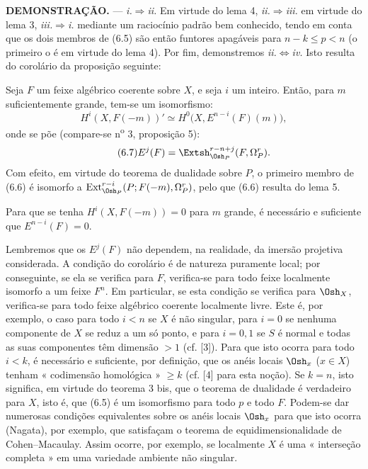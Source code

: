 \noindent\textbf{DEMONSTRAÇÃO.} --- \textit{i.}$\Rightarrow$\textit{ii.} Em
virtude do lema 4, \textit{ii.}$\Rightarrow$\textit{iii.} em virtude do lema 3,
\textit{iii.}$\Rightarrow$\textit{i.} mediante um raciocínio padrão bem conhecido,
tendo em conta que os dois membros de (6.5) são então funtores apagáveis
para $n-k\leq p<n$ (o primeiro o é em virtude do lema 4). Por fim, demonstremos
\textit{ii.}$\Leftrightarrow$\textit{iv.} Isto resulta do corolário da
proposição seguinte:

 Seja $F$ um feixe algébrico coerente sobre $X$, e
seja $i$ um inteiro. Então, para $m$ suficientemente grande, tem-se um isomorfismo:
\begin{equation}\tag{6.6}
  H^{i}(X,F(-m))'
  \simeq H^{0}\bigl(X,E^{n-i}(F)(m)\bigr),
\end{equation}
onde se põe (compare-se n\textsuperscript{o} 3, proposição 5):
\begin{equation}\tag{6.7}
  E^{j}(F)=\Extsh_{\Osh_P}^{r-n+j}(F,\Omega_P^{r}).
\end{equation}
Com efeito, em virtude do teorema de dualidade sobre $P$, o primeiro membro de (6.6)
é isomorfo a
$\operatorname{Ext}_{\Osh_P}^{r-i}(P;F(-m),\Omega_P^{r})$, pelo que (6.6) resulta
do lema 5.

 Para que se tenha $H^{i}(X,F(-m))=0$ para $m$ grande, é
necessário e suficiente que $E^{n-i}(F)=0$.

Lembremos que os $E^{j}(F)$ não dependem, na realidade, da imersão projetiva
considerada. A condição do corolário é de natureza puramente local; por conseguinte,
se ela se verifica para $F$, verifica-se para todo feixe localmente
isomorfo a um feixe $F^{n}$. Em particular, se esta condição se verifica
para $\Osh_X$, verifica-se para todo feixe algébrico coerente localmente
livre. Este é, por exemplo, o caso para todo $i<n$ se $X$ é não singular, para
$i=0$ se nenhuma componente de $X$ se reduz a um só ponto, e para $i=0,1$
se $S$ é normal e todas as suas componentes têm dimensão $>1$ (cf.
[3]). Para que isto ocorra para todo
$i<k$, é necessário e suficiente, por definição, que os anéis locais
$\Osh_x$ ($x\in X$) tenham « codimensão homológica » $\geq k$ (cf. [4]
para esta noção). Se $k=n$, isto significa, em virtude do teorema 3 bis, que o
teorema de dualidade é verdadeiro para $X$, isto é, que (6.5) é um isomorfismo para
todo $p$ e todo $F$. Podem-se dar numerosas condições equivalentes sobre
os anéis locais $\Osh_x$ para que isto ocorra (Nagata), por exemplo, que
satisfaçam o teorema de equidimensionalidade de Cohen--Macaulay. Assim ocorre,
por exemplo, se localmente $X$ é uma « interseção completa » em uma
variedade ambiente não singular.

